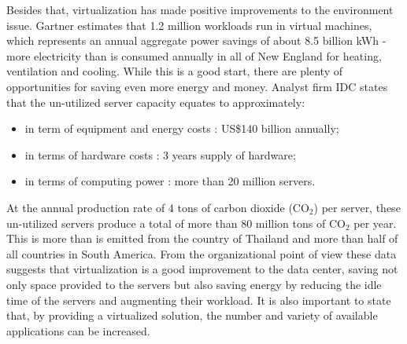 {                Besides that, virtualization has made positive improvements to the environment issue. Gartner \cite{GartnetStamford07} estimates that 1.2 million workloads run in virtual machines, which represents an annual aggregate power savings of about 8.5 billion kWh - more electricity than is consumed annually in all of New England for heating, ventilation and cooling. While this is a good start, there are plenty of opportunities for saving even more energy and money. Analyst firm IDC \cite{IDCDoc07} states that the un-utilized server capacity equates to approximately:
                \begin{itemize}
                    \item in term of equipment and energy costs : US\$140 billion annually;
                    \item in terms of hardware costs : 3 years supply of hardware;
                    \item in terms of computing power : more than 20 million servers.
                \end{itemize}
                At the annual production rate of 4 tons of carbon dioxide (CO$_{2}$) per server, these un-utilized servers produce a total of more than 80 million tons of CO$_{2}$ per year. This is more than is emitted from the country of Thailand and more than half of all countries in South America. From the organizational point of view these data suggests that virtualization is a good improvement to the data center, saving not only space provided to the servers but also saving energy by reducing the idle time of the servers and augmenting their workload. It is also important to state that, by providing a virtualized solution, the number and variety of available applications can be increased.
                
}
